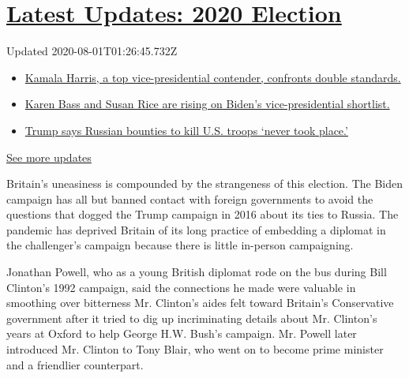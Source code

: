 \hypertarget{latest-updates-2020-election}{%
\section{\texorpdfstring{\href{https://www.nytimes3xbfgragh.onion/2020/07/31/us/elections/biden-vs-trump.html?action=click\&pgtype=Article\&state=default\&region=MAIN_CONTENT_1\&context=storylines_live_updates}{Latest
Updates: 2020
Election}}{Latest Updates: 2020 Election}}\label{latest-updates-2020-election}}

Updated 2020-08-01T01:26:45.732Z

\begin{itemize}
\tightlist
\item
  \href{https://www.nytimes3xbfgragh.onion/2020/07/31/us/elections/biden-vs-trump.html?action=click\&pgtype=Article\&state=default\&region=MAIN_CONTENT_1\&context=storylines_live_updates\#link-29fdff45}{Kamala
  Harris, a top vice-presidential contender, confronts double
  standards.}
\item
  \href{https://www.nytimes3xbfgragh.onion/2020/07/31/us/elections/biden-vs-trump.html?action=click\&pgtype=Article\&state=default\&region=MAIN_CONTENT_1\&context=storylines_live_updates\#link-13ec3d9c}{Karen
  Bass and Susan Rice are rising on Biden's vice-presidential
  shortlist.}
\item
  \href{https://www.nytimes3xbfgragh.onion/2020/07/31/us/elections/biden-vs-trump.html?action=click\&pgtype=Article\&state=default\&region=MAIN_CONTENT_1\&context=storylines_live_updates\#link-49e9a016}{Trump
  says Russian bounties to kill U.S. troops `never took place.'}
\end{itemize}

\href{https://www.nytimes3xbfgragh.onion/2020/07/31/us/elections/biden-vs-trump.html?action=click\&pgtype=Article\&state=default\&region=MAIN_CONTENT_1\&context=storylines_live_updates}{See
more updates}

Britain's uneasiness is compounded by the strangeness of this election.
The Biden campaign has all but banned contact with foreign governments
to avoid the questions that dogged the Trump campaign in 2016 about its
ties to Russia. The pandemic has deprived Britain of its long practice
of embedding a diplomat in the challenger's campaign because there is
little in-person campaigning.

Jonathan Powell, who as a young British diplomat rode on the bus during
Bill Clinton's 1992 campaign, said the connections he made were valuable
in smoothing over bitterness Mr. Clinton's aides felt toward Britain's
Conservative government after it tried to dig up incriminating details
about Mr. Clinton's years at Oxford to help George H.W. Bush's campaign.
Mr. Powell later introduced Mr. Clinton to Tony Blair, who went on to
become prime minister and a friendlier counterpart.

